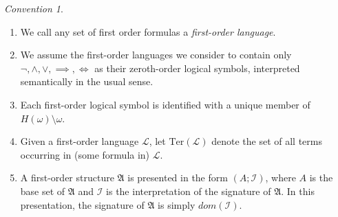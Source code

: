 \documentclass[12pt, twoside]{memoir}
\numberwithin{equation}{section}
\theoremstyle{definition}
\theoremstyle{remark}
\newtheorem{con}[thm]{Convention}
\theoremstyle{definition}
\theoremstyle{definition}
\theoremstyle{definition}
\theoremstyle{remark}
\begin{document}
\begin{con}\label{firstconv}
\leavevmode
\begin{enumerate}[label=(\arabic*)]
    \item We call any set of first order formulas a \emph{first-order language}.
    \item We assume the first-order languages we consider to contain only $\neg, \wedge, \vee, \implies, \iff$ as their zeroth-order logical symbols, interpreted semantically in the usual sense. 
    \item Each first-order logical symbol is identified with a unique member of $H(\omega) \setminus \omega$.
    \item Given a first-order language $\mathcal{L}$, let $\mathrm{Ter}(\mathcal{L})$ denote the set of all terms occurring in (some formula in) $\mathcal{L}$.
    \item A first-order structure $\mathfrak{A}$ is presented in the form $(A; \mathcal{I})$, where $A$ is the base set of $\mathfrak{A}$ and $\mathcal{I}$ is the interpretation of the signature of $\mathfrak{A}$. In this presentation, the signature of $\mathfrak{A}$ is simply $dom(\mathcal{I})$. 
    

\end{enumerate}
\end{con}
\end{document}

